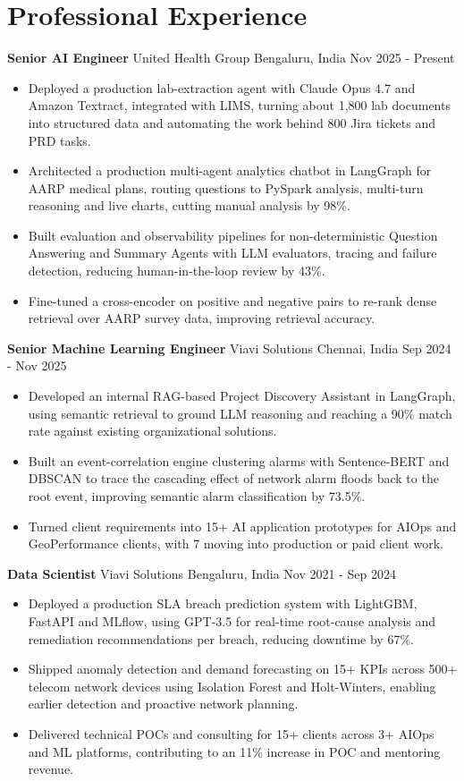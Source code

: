 \documentclass[10pt,a4paper]{article}
\newcommand{\role}[4]{\textbf{#1} \textbar{} #2 \hfill #3 \textbar{} #4\par}
\begin{document}
\section{Professional Experience}
\role{Senior AI Engineer}{United Health Group}{Bengaluru, India}{Nov 2025 - Present}
\begin{itemize}
  \item Deployed a production lab-extraction agent with Claude Opus 4.7 and Amazon Textract, integrated with LIMS, turning about 1,800 lab documents into structured data and automating the work behind 800 Jira tickets and PRD tasks.
  \item Architected a production multi-agent analytics chatbot in LangGraph for AARP medical plans, routing questions to PySpark analysis, multi-turn reasoning and live charts, cutting manual analysis by 98\%.
  \item Built evaluation and observability pipelines for non-deterministic Question Answering and Summary Agents with LLM evaluators, tracing and failure detection, reducing human-in-the-loop review by 43\%.
  \item Fine-tuned a cross-encoder on positive and negative pairs to re-rank dense retrieval over AARP survey data, improving retrieval accuracy.
\end{itemize}
\vspace{3pt}
\role{Senior Machine Learning Engineer}{Viavi Solutions}{Chennai, India}{Sep 2024 - Nov 2025}
\begin{itemize}
  \item Developed an internal RAG-based Project Discovery Assistant in LangGraph, using semantic retrieval to ground LLM reasoning and reaching a 90\% match rate against existing organizational solutions.
  \item Built an event-correlation engine clustering alarms with Sentence-BERT and DBSCAN to trace the cascading effect of network alarm floods back to the root event, improving semantic alarm classification by 73.5\%.
  \item Turned client requirements into 15+ AI application prototypes for AIOps and GeoPerformance clients, with 7 moving into production or paid client work.
\end{itemize}
\vspace{3pt}
\role{Data Scientist}{Viavi Solutions}{Bengaluru, India}{Nov 2021 - Sep 2024}
\begin{itemize}
  \item Deployed a production SLA breach prediction system with LightGBM, FastAPI and MLflow, using GPT-3.5 for real-time root-cause analysis and remediation recommendations per breach, reducing downtime by 67\%.
  \item Shipped anomaly detection and demand forecasting on 15+ KPIs across 500+ telecom network devices using Isolation Forest and Holt-Winters, enabling earlier detection and proactive network planning.
  \item Delivered technical POCs and consulting for 15+ clients across 3+ AIOps and ML platforms, contributing to an 11\% increase in POC and mentoring revenue.
\end{itemize}
\end{document}
